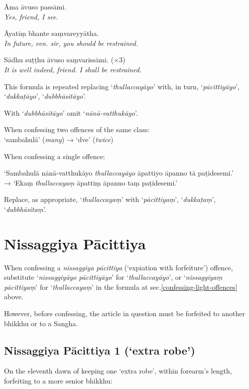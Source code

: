 \hangindent=25pt%
\parbox{22pt}{} Āma āvuso passāmi.\\ \emph{Yes, friend, I see.}

\hangindent=25pt%
\parbox{22pt}{} Āyatiṃ bhante saṃvareyyātha.\\ \emph{In future, ven. sir, you should be restrained.}

\hangindent=25pt%
\parbox{22pt}{} Sādhu suṭṭhu āvuso saṃvarissāmi. (×3)\\ \emph{It is well indeed, friend. I shall be restrained.}

This formula is repeated replacing ‘\emph{thullaccayāyo}’ with, in turn, ‘\emph{pācittiyāyo}’,
‘\emph{dukkaṭāyo}’, ‘\emph{dubbhāsitāyo}’.

With ‘\emph{dubbhāsitāyo}’ omit ‘\emph{nānā-vatthukāyo}’.

When confessing two offences of the same class:\\
‘sambahulā’ (\emph{many}) → ‘dve’ (\emph{twice})

When confessing a single offence:

‘Sambahulā nānā-vatthukāyo \emph{thullaccayāyo} āpattiyo āpanno tā paṭidesemi.’\\
→ ‘Ekaṃ \emph{thullaccayaṃ} āpattiṃ āpanno taṃ paṭidesemi.’

Replace, as appropriate, ‘\emph{thullaccayaṃ}’ with ‘\emph{pācittiyaṃ}’, ‘\emph{dukkaṭaṃ}’, ‘\emph{dubbhāsitaṃ}’.

\section{Nissaggiya Pācittiya}

When confessing a \emph{nissaggiya pācittiya} (‘expiation with forfeiture’)
offence, substitute ‘\emph{nissaggiyāyo pācittiyāyo}’ for
‘\emph{thullaccayāyo}’, or ‘\emph{nissaggiyaṃ pācittiyaṃ}’ for
‘\emph{thullaccayaṃ}’ in the formula at sec.\ref{confessing-light-offences}
above.

However, before confessing, the article in question must be forfeited to another
bhikkhu or to a Sangha. 

\subsection{Nissaggiya Pācittiya 1 (‘extra robe’)}
\label{np-1-extra-robe}

On the eleventh dawn of keeping one ‘extra robe’, within forearm's length,
forfeiting to a more senior bhikkhu:

